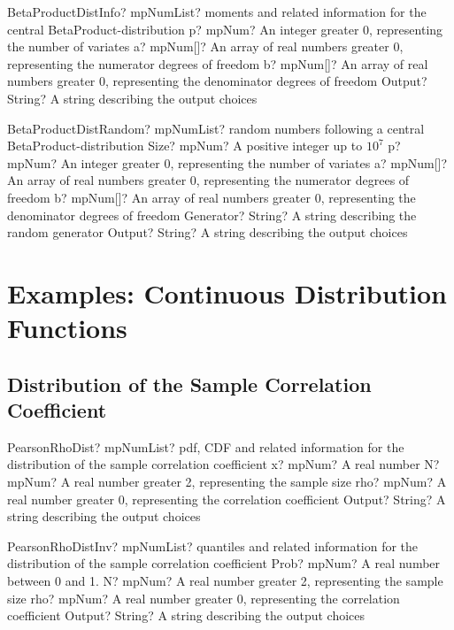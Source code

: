 \documentclass[12pt,a4paper,openany]{book}
\begin{document}
\begin{mpFunctionsExtract}
\mpFunctionFourNotImplemented
{BetaProductDistInfo? mpNumList? moments and related information for the central BetaProduct-distribution}
{p? mpNum? An integer greater 0, representing the number of variates}
{a? mpNum[]? An array of real numbers greater 0, representing the numerator  degrees of freedom}
{b? mpNum[]? An array of real numbers greater 0, representing the denominator degrees of freedom}
{Output? String? A string describing the output choices}
\end{mpFunctionsExtract}

\begin{mpFunctionsExtract}
\mpFunctionSixNotImplemented
{BetaProductDistRandom? mpNumList? random numbers following a central BetaProduct-distribution}
{Size? mpNum? A positive integer up to $10^7$}
{p? mpNum? An integer greater 0, representing the number of variates}
{a? mpNum[]? An array of real numbers greater 0, representing the numerator  degrees of freedom}
{b? mpNum[]? An array of real numbers greater 0, representing the denominator degrees of freedom}
{Generator? String? A string describing the random generator}
{Output? String? A string describing the output choices}
\end{mpFunctionsExtract}

\chapter{Examples: Continuous Distribution Functions}

\section{Distribution of the Sample Correlation Coefficient}

\begin{mpFunctionsExtract}
\mpFunctionFourNotImplemented
{PearsonRhoDist? mpNumList? pdf, CDF and related information for the distribution of the sample correlation coefficient}
{x? mpNum? A real number}
{N? mpNum? A real number greater 2, representing the sample size}
{rho? mpNum? A real number greater 0, representing the correlation coefficient}
{Output? String? A string describing the output choices}
\end{mpFunctionsExtract}

\begin{mpFunctionsExtract}
\mpFunctionFourNotImplemented
{PearsonRhoDistInv? mpNumList? quantiles and related information for the distribution of the sample correlation coefficient}
{Prob? mpNum? A real number between 0 and 1.}
{N? mpNum? A real number greater 2, representing the sample size}
{rho? mpNum? A real number greater 0, representing the correlation coefficient}
{Output? String? A string describing the output choices}
\end{mpFunctionsExtract}
\end{document}
